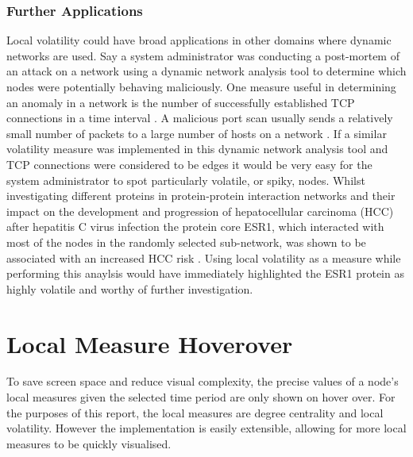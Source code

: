 \subsubsection{Further Applications}
Local volatility could have broad applications in other domains where dynamic networks are used. 
\newline\newline
Say a system administrator was conducting a post-mortem of an attack on a network using a dynamic network analysis tool to determine which nodes were potentially behaving maliciously. One measure useful in determining an anomaly in a network is the number of successfully established TCP connections in a time interval \cite{fnpfid}. A malicious port scan usually sends a relatively small number of packets to a large number of hosts on a network \cite{fnpfid}. If a similar volatility measure was implemented in this dynamic network analysis tool and TCP connections were considered to be edges it would be very easy for the system administrator to spot particularly volatile, or spiky, nodes.
\newline\newline
Whilst investigating different proteins in protein-protein interaction networks and their impact on the development and progression of hepatocellular carcinoma (HCC) after hepatitis C virus infection the protein core ESR1, which interacted with most of the nodes in the randomly selected sub-network, was shown to be associated with an increased HCC risk \cite{acaotdbnihih}. Using local volatility as a measure while performing this anaylsis would have immediately highlighted the ESR1 protein as highly volatile and worthy of further investigation.


\section{Local Measure Hoverover}
To save screen space and reduce visual complexity, the precise values of a node's local measures given the selected time period are only shown on hover over. For the purposes of this report, the local measures are degree centrality and local volatility. However the implementation is easily extensible, allowing for more local measures to be quickly visualised.


